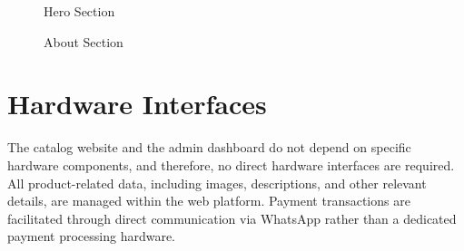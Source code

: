 \documentclass[oneside,a4paper,12pt,explicit]{book}
\begin{document}
\begin{figure}[H]
    \centering
    \begin{minipage}{0.48\textwidth}
        \centering
        \caption{Hero Section}
    \end{minipage}
    \hfill
    \begin{minipage}{0.44\textwidth}
        \centering
        \caption{About Section}
    \end{minipage}
\end{figure}


\section{Hardware Interfaces}
The catalog website and the admin dashboard do not depend on specific hardware components, and therefore, no direct hardware interfaces are required. All product-related data, including images, descriptions, and other relevant details, are managed within the web platform. Payment transactions are facilitated through direct communication via WhatsApp rather than a dedicated payment processing hardware.
\end{document}
